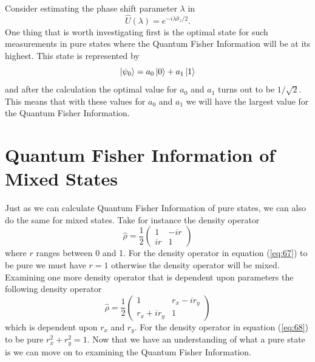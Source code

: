 \documentclass[twocolumn]{article}
\begin{document}
Consider estimating the phase shift parameter $\lambda$ in
\begin{equation} \label{eq:65}
\hat{U}(\lambda)=e^{-i\lambda\hat{\sigma}_z/2}.
\end{equation}
One thing that is worth investigating first is the optimal state for such measurements in pure states where the Quantum Fisher Information will be at its highest. This state is represented by
\begin{equation} \label{eq:66}
\ket{\psi_0}=a_0\ket{0}+a_1\ket{1}
\end{equation}
and after the calculation the optimal value for $a_0$ and $a_1$ turns out to be $1/\sqrt{2}$. This means that with these values for $a_0$ and $a_1$ we will have the largest value for the Quantum Fisher Information. 
\section*{Quantum Fisher Information of Mixed States}
Just as we can calculate Quantum Fisher Information of pure states, we can also do the same for mixed states. Take for instance the density operator
\begin{equation} \label{eq:67}
\hat{\rho}=\frac{1}{2}
\begin{pmatrix}
1 & -ir \\
ir & 1
\end{pmatrix}
\end{equation}
where $r$ ranges between 0 and 1. For the density operator in equation (\ref{eq:67}) to be pure we must have $r=1$ otherwise the density operator will be mixed. Examining one more density operator that is dependent upon parameters the following density operator 
\begin{equation} \label{eq:68}
\hat{\rho}=\frac{1}{2}
\begin{pmatrix}
1 & r_x-ir_y \\
r_x+ir_y & 1
\end{pmatrix}
\end{equation}
which is dependent upon $r_x$ and $r_y$. For the density operator in equation (\ref{eq:68}) to be pure $r_x^2+r_y^2=1$. Now that we have an understanding of what a pure state is we can move on to examining the Quantum Fisher Information.
\end{document}
